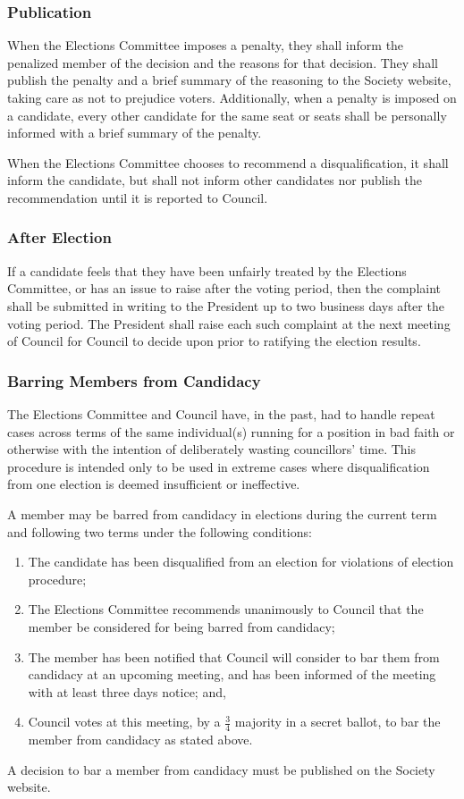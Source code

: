 \subsubsection{Publication}
When the Elections Committee imposes a penalty, they shall inform the penalized member of the decision and the reasons for that decision.
They shall publish the penalty and a brief summary of the reasoning to the Society website, taking care as not to prejudice voters.
Additionally, when a penalty is imposed on a candidate, every other candidate for the same seat or seats shall be personally informed with a brief summary of the penalty.

When the Elections Committee chooses to recommend a disqualification, it shall inform the candidate, but shall not inform other candidates nor publish the recommendation until it is reported to Council.

\subsubsection{After Election}
If a candidate feels that they have been unfairly treated by the Elections Committee, or has an issue to raise after the voting period, then the complaint shall be submitted in writing to the President up to two business days after the voting period.
The President shall raise each such complaint at the next meeting of Council for Council to decide upon prior to ratifying the election results.

\subsubsection{Barring Members from Candidacy}
The Elections Committee and Council have, in the past, had to handle repeat cases across terms of the same individual(s) running for a position in bad faith or otherwise with the intention of deliberately wasting councillors' time. This procedure is intended only to be used in extreme cases where disqualification from one election is deemed insufficient or ineffective.

A member may be barred from candidacy in elections during the current term and following two terms under the following conditions:
\begin{enumerate}
    \item The candidate has been disqualified from an election for violations of election procedure; %
    \item The Elections Committee recommends unanimously to Council that the member be considered for being barred from candidacy;
    \item The member has been notified that Council will consider to bar them from candidacy at an upcoming meeting, and has been informed of the meeting with at least three days notice; and,
    \item Council votes at this meeting, by a $\frac34$ majority in a secret ballot, to bar the member from candidacy as stated above.
\end{enumerate}
A decision to bar a member from candidacy must be published on the Society website.

